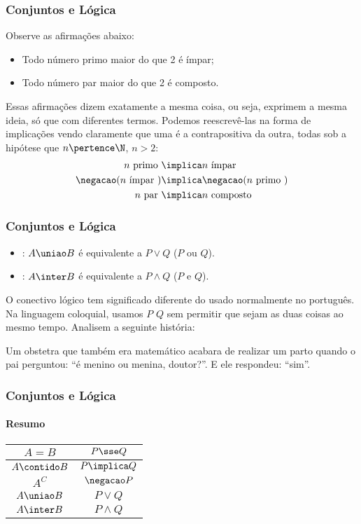 \begin{frame}
	\frametitle{Conjuntos e Lógica} 

	\begin{exemplo}
		Observe as afirmações abaixo:
		\begin{itemize}
			\item Todo número primo maior do que 2 é ímpar;
			\item Todo número par maior do que 2 é composto.
		\end{itemize}
		Essas afirmações dizem exatamente a mesma coisa, ou seja, exprimem a mesma ideia, só que com diferentes termos. Podemos reescrevê-las na forma de implicações vendo claramente que uma é a contrapositiva da outra, todas sob a hipótese que  $n \pertence \N$, $n>2$:
		\begin{align*}
		          n \text{ primo } & \implica n \text{ ímpar } \\
		\negacao(n \text{ ímpar }) & \implica \negacao ( n \text{ primo }) \\
		            n \text{ par } & \implica n \text{ composto }
		\end{align*}
	\end{exemplo}
\end{frame}


\begin{frame}
	\frametitle{Conjuntos e Lógica} 

	\begin{itemize}
		\item {}: $A \uniao B$ é equivalente a $P \lor Q$ ($P$ ou $Q$).
		\item {}: $A \inter B$ é equivalente a $P \land Q$ ($P$ e $Q$).
	\end{itemize}

	\begin{observacao}
		O conectivo lógico  tem significado diferente do usado normalmente no português. Na linguagem coloquial, usamos $P$  $Q$ sem permitir que sejam as duas coisas ao mesmo tempo. Analisem a seguinte história:

		Um obstetra que também era matemático acabara de realizar um parto quando o pai perguntou: ``é menino ou menina, doutor?''. E ele respondeu: ``sim''.
	\end{observacao}
\end{frame}


\begin{frame}
	\frametitle{Conjuntos e Lógica} \framesubtitle{Resumo}
	\begin{center}
		\begin{tabular}{|c|c|}
			\hline
			$A=B$          & $P \sse Q$     \\ \hline
			$A \contido B$ & $P \implica Q$ \\ \hline
			$A^C$          & $\negacao P$   \\ \hline
			$A \uniao B$   & $P \lor Q$     \\ \hline
			$A \inter B$   & $P \land Q$    \\
			\hline
		\end{tabular}
	\end{center}
\end{frame}


